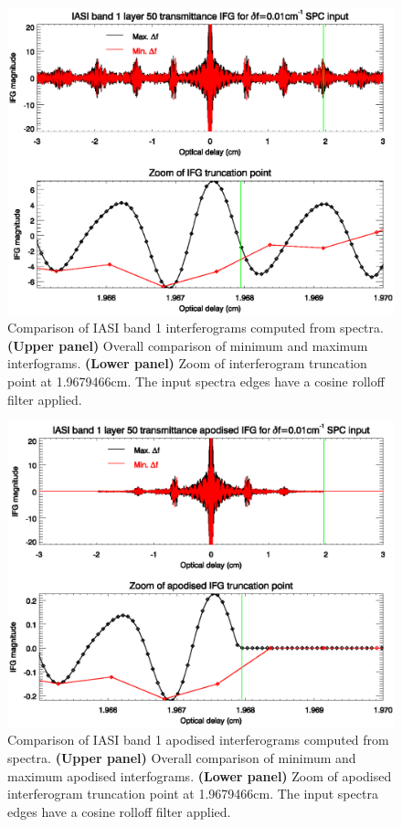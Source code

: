 \begin{figure}[htp]
  \centering
  \includegraphics[scale=0.8]{graphics/band1_lyr50_ifg_comparison_min-max_deltaf_0.01.eps}
  \caption{Comparison of IASI band 1 interferograms computed from  spectra. \textbf{(Upper panel)} Overall comparison of minimum \Df{} and maximum \Df{} interfograms. \textbf{(Lower panel)} Zoom of interferogram truncation point at 1.9679466cm. The input spectra edges have a cosine rolloff filter applied.}
  \label{fig:band1_lyr50_ifg_comparison_min-max_deltaf_0.01}
\end{figure}

\begin{figure}[htp]
  \centering
  \includegraphics[scale=0.8]{graphics/band1_lyr50_aifg_comparison_min-max_deltaf_0.01.eps}
  \caption{Comparison of IASI band 1 apodised interferograms computed from  spectra. \textbf{(Upper panel)} Overall comparison of minimum \Df{} and maximum \Df{} apodised interfograms. \textbf{(Lower panel)} Zoom of apodised interferogram truncation point at 1.9679466cm. The input spectra edges have a cosine rolloff filter applied.}
  \label{fig:band1_lyr50_aifg_comparison_min-max_deltaf_0.01}
\end{figure}

